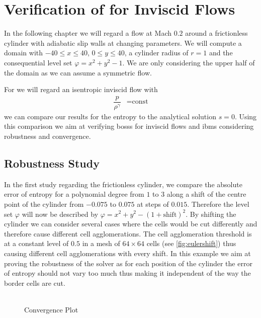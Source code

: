 \chapter{Verification of  for Inviscid Flows}
	\label{eulerVerification}
	In the following chapter we will regard a flow at Mach $0.2$ around a frictionless cylinder with adiabatic slip walls at changing parameters.
	We will compute a domain with  $-40 \leq x \leq 40$, $0 \leq y \leq 40$, a cylinder radius of $r = 1$ and the consequential level set $\varphi = x^2 + y^2 -1$. We are only considering the upper half of the domain as we can assume a symmetric flow. \\ \indent
	
	For we will regard an isentropic inviscid flow with 
	\begin{align}
			\dfrac{p}{\rho^\gamma} &= \text{const}
	\end{align}
	we can compare our results for the entropy to the analytical solution $s = 0$. Using this comparison we aim at verifying \gls{bosss} for inviscid flows and \gls{ibm}s considering robustness and convergence.
	
	\section{Robustness Study}
	In the first study regarding the frictionless cylinder, we compare the absolute error of entropy for a polynomial degree from $1$ to $3$ along a shift of the centre point of the cylinder from $-0.075$ to $0.075$ at steps of $0.015$. Therefore the level set $\varphi$ will now be described by $\varphi = x^2 + y^2 - (1+ \text{shift})^2$. By shifting the cylinder we can consider several cases where the cells would be cut differently and therefore cause different cell agglomerations. The cell agglomeration threshold is at a constant level of $0.5$ in a mesh of $64 \times 64$ cells (see \cref{fig:eulershift}) thus causing different cell agglomerations with every shift. In this example we aim at proving the robustness of the solver as for each position of the cylinder the error of entropy should not vary too much thus making it independent of the way the border cells are cut. \\ \\

	\begin{figure}[htp]	
		\centering
		\caption{Convergence Plot}
		\label{shifterror}
	\end{figure}
	

